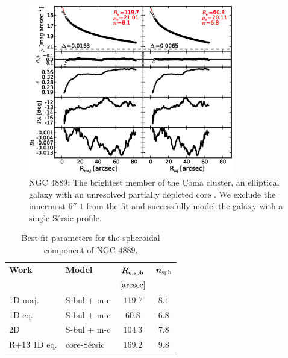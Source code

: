 \documentclass[preprint2]{emulateapj}
\newcommand{\fitfigurewidth}{0.8\textwidth}
\begin{document}
  \begin{figure}[h]
  \begin{center}
  \includegraphics[width=\fitfigurewidth]{n4889_1Dfit.eps}
  \caption{NGC 4889: 
  The brightest member of the Coma cluster, 
  an elliptical galaxy with an unresolved partially depleted core \citep{rusli2013}. %
  We exclude the innermost $6''.1$ from the fit and
  successfully model the galaxy with a single S\'ersic profile.
  }
  \end{center}
  \end{figure}

  \begin{table}[h]
  \small
  \caption{Best-fit parameters for the spheroidal component of NGC 4889.}
  \begin{center}
  \begin{tabular}{llcc}
  \hline
  {\bf Work} & {\bf Model}   & $\bm R_{\rm e,sph}$    & $\bm n_{\rm sph}$ \\
    &  &  $[\rm arcsec]$ & \\
  \hline
  1D maj. & S-bul + m-c & $119.7$  &  $8.1$ \\
  1D eq.  & S-bul + m-c & $60.8$	&  $6.8$ \\
  2D      & S-bul + m-c & $104.3$  &  $7.8$ \\
  \hline
  R+13 1D eq.         & core-S\'ersic & $169.2$  &  $9.8$ \\
  \hline
  \end{tabular}
  \end{center}
  \label{tab:n4889}
  \end{table}
    
\end{document}
